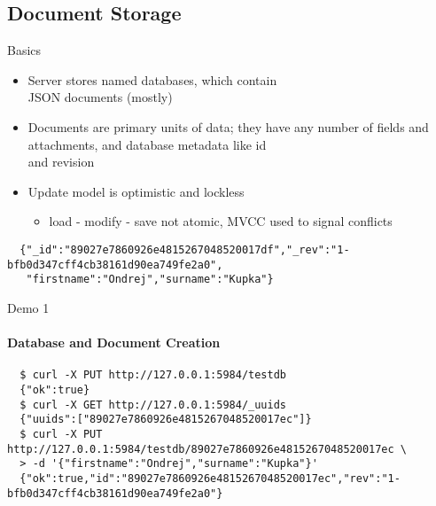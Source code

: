\documentclass{beamer}
\begin{document}
\subsection{Document Storage}
\begin{frame}[fragile]{Basics}
  \begin{itemize}
    \item Server stores named databases, which contain\\JSON documents (mostly)
    \item Documents are primary units of data; they have any number of fields
          and attachments, and database metadata like id\\and revision
    \item Update model is optimistic and lockless
    \begin{itemize}
      \item load - modify - save not atomic, MVCC used to signal conflicts
    \end{itemize}
  \end{itemize}
  \fontsize{6}{8}\selectfont
  \begin{verbatim}
  {"_id":"89027e7860926e4815267048520017df","_rev":"1-bfb0d347cff4cb38161d90ea749fe2a0",
   "firstname":"Ondrej","surname":"Kupka"}
  \end{verbatim}
\end{frame}

\begin{frame}[fragile]{Demo 1}
  \framesubtitle{Database and Document Creation}
  \fontsize{6}{8}\selectfont
  \begin{verbatim}
  $ curl -X PUT http://127.0.0.1:5984/testdb
  {"ok":true}
  $ curl -X GET http://127.0.0.1:5984/_uuids
  {"uuids":["89027e7860926e4815267048520017ec"]}
  $ curl -X PUT http://127.0.0.1:5984/testdb/89027e7860926e4815267048520017ec \
  > -d '{"firstname":"Ondrej","surname":"Kupka"}'
  {"ok":true,"id":"89027e7860926e4815267048520017ec","rev":"1-bfb0d347cff4cb38161d90ea749fe2a0"}
  \end{verbatim}
\end{frame}
\end{document}
